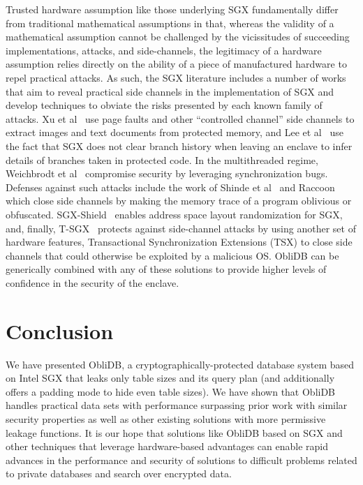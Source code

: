 \documentclass[letterpaper,twocolumn,10pt]{article}
\def\name/{ObliDB}
\begin{document}
Trusted hardware assumption like those underlying SGX fundamentally differ from traditional mathematical assumptions in that, whereas the validity of a mathematical assumption cannot be challenged by the vicissitudes of succeeding implementations, attacks, and side-channels, the legitimacy of a hardware assumption relies directly on the ability of a piece of manufactured hardware to repel practical attacks. As such, the SGX literature includes a number of works that aim to reveal practical side channels in the implementation of SGX and develop techniques to obviate the risks presented by each known family of attacks. Xu et al~\cite{XCP15} use page faults and other ``controlled channel'' side channels to extract images and text documents from protected memory, and Lee et al~\cite{LSG+16} use the fact that SGX does not clear branch history when leaving an enclave to infer details of branches taken in protected code. In the multithreaded regime, Weichbrodt et al~\cite{WKPK16} compromise security by leveraging synchronization bugs. Defenses against such attacks include the work of Shinde et al~\cite{SCNS16} and Raccoon~\cite{RLT15} which close side channels by making the memory trace of a program oblivious or obfuscated. SGX-Shield~\cite{SLK+17} enables address space layout randomization for SGX, and, finally, T-SGX~\cite{SLKP17} protects against side-channel attacks by using another set of hardware features, Transactional Synchronization Extensions (TSX) to close side channels that could otherwise be exploited by a malicious OS. \name/ can be generically combined with any of these solutions to provide higher levels of confidence in the security of the enclave.  

\section{Conclusion}\label{conclusion}
We have presented \name/, a cryptographically-protected database system based on Intel SGX that leaks only table sizes and its query plan (and additionally offers a padding mode to hide even table sizes). We have shown that \name/ handles practical data sets with performance surpassing prior work with similar security properties as well as other existing solutions with more permissive leakage functions. It is our hope that solutions like \name/ based on SGX and other techniques that leverage hardware-based advantages can enable rapid advances in the performance and security of solutions to difficult problems related to private databases and search over encrypted data. 


{\footnotesize 
}
 

\end{document}

